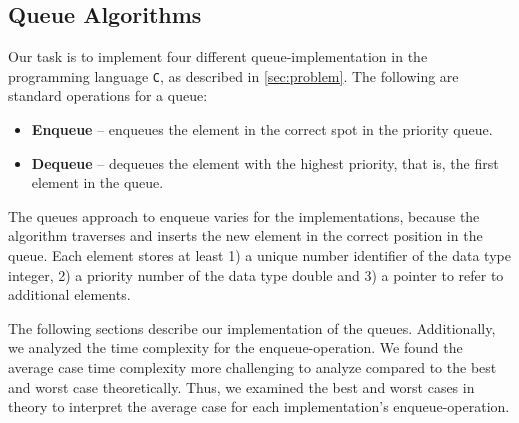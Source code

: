 \documentclass[a4paper,11pt]{kth-mag}
\newcommand*{\skippara}{\par\vspace{\baselineskip} \noindent}
\begin{document}
\subsection{Queue Algorithms}\label{sec:algorithms}
Our task is to implement four different queue-implementation in the programming language \texttt{C}, as described in \cref{sec:problem}.
The following are standard operations for a queue:
\begin{itemize}
    \item \textbf{Enqueue} -- enqueues the element in the correct spot in the priority queue.
    \item \textbf{Dequeue} -- dequeues the element with the highest priority, that is, the first element in the queue.
\end{itemize}

\skippara The queues approach to enqueue varies for the implementations, because the algorithm traverses and inserts the new element in the correct position in the queue.
Each element stores at least 1) a unique number identifier of the data type integer, 2) a priority number of the data type double and 3) a pointer to refer to additional elements.

\skippara The following sections describe our implementation of the queues.
Additionally, we analyzed the time complexity for the enqueue-operation.
We found the average case time complexity more challenging to analyze compared to the best and worst case theoretically.
Thus, we examined the best and worst cases in theory to interpret the average case for each implementation's enqueue-operation.
\end{document}
